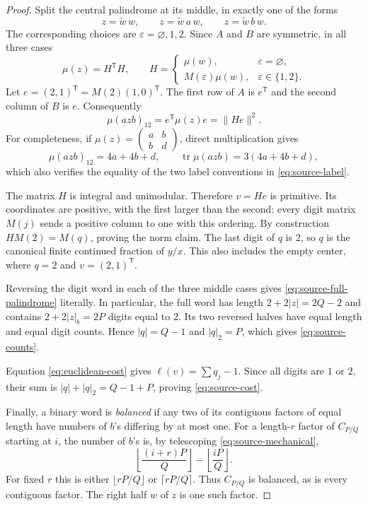 \begin{proof}
Split the central palindrome at its middle, in exactly one of the forms
$$
 z=\widetilde w\,w,\qquad
 z=\widetilde w\,a\,w,\qquad
 z=\widetilde w\,b\,w.
$$
The corresponding choices are $\varepsilon=\varnothing,1,2$.
Since $A$ and $B$ are symmetric, in all three cases
\begin{equation}\label{eq:source-half-factorization}
 \mu(z)=H^{\mathsf T}H,\qquad
 H=\begin{cases}
       \mu(w),&\varepsilon=\varnothing,\\
       M(\varepsilon)\mu(w),&\varepsilon\in\{1,2\}.
    \end{cases}
\end{equation}
Let $e=(2,1)^{\mathsf T}=M(2)(1,0)^{\mathsf T}$. The first row of
$A$ is $e^{\mathsf T}$ and the second column of $B$ is $e$.
Consequently
$$
 \mu(azb)_{12}=e^{\mathsf T}\mu(z)e=\|He\|^2.
$$
For completeness, if
$\mu(z)=\begin{pmatrix}a&b\\b&d\end{pmatrix}$, direct multiplication
gives
$$
 \mu(azb)_{12}=4a+4b+d,
 \qquad \operatorname{tr}\mu(azb)=3(4a+4b+d),
$$
which also verifies the equality of the two label conventions in
\eqref{eq:source-label}.

The matrix $H$ is integral and unimodular. Therefore $v=He$ is
primitive. Its coordinates are positive, with the first larger than
the second: every digit matrix $M(j)$ sends a positive column to one
with this ordering. By construction $HM(2)=M(q)$, proving the norm
claim. The last digit of $q$ is $2$, so $q$ is the canonical finite
continued fraction of $y/x$. This also includes the empty center,
where $q=2$ and $v=(2,1)^{\mathsf T}$.

Reversing the digit word in each of the three middle cases gives
\eqref{eq:source-full-palindrome} literally. In particular, the full
word has length $2+2|z|=2Q-2$ and contains
$2+2|z|_b=2P$ digits equal to $2$. Its two reversed halves have equal
length and equal digit counts. Hence $|q|=Q-1$ and $|q|_2=P$,
which gives \eqref{eq:source-counts}.

Equation \eqref{eq:euclidean-cost} gives $\ell(v)=\sum q_j-1$.
Since all digits are $1$ or $2$, their sum is $|q|+|q|_2=Q-1+P$,
proving \eqref{eq:source-cost}.

Finally, a binary word is \emph{balanced} if any two of its contiguous
factors of equal length have numbers of $b$'s differing by at most one.
For a length-$r$ factor of $C_{P/Q}$ starting at $i$, the number of
$b$'s is, by telescoping \eqref{eq:source-mechanical},
$$
 \left\lfloor\frac{(i+r)P}{Q}\right\rfloor
 -\left\lfloor\frac{iP}{Q}\right\rfloor.
$$
For fixed $r$ this is either $\lfloor rP/Q\rfloor$ or
$\lceil rP/Q\rceil$. Thus $C_{P/Q}$ is balanced, as is every
contiguous factor. The right half $w$ of $z$ is one such factor.
\end{proof}

